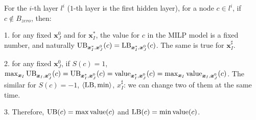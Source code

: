 				
				\begin{lemma}
					For the $i$-th layer $l^i$ ($1$-th layer is the first hidden layer), for a node $c\in l^i$, if $c\notin B_{zero}$, then:
					
					\vspace*{1ex}
					
					1. for any fixed $\boldsymbol{x}^0_J$ and for $\boldsymbol{x}^*_I$, the value for $c$ in the MILP model is a fixed number, and naturally $\mathrm{UB}_{\boldsymbol{x}^*_I,\boldsymbol{x}^0_J}(c)=\mathrm{LB}_{\boldsymbol{x}^*_I,\boldsymbol{x}^0_J}(c)$. The same is true for $\boldsymbol{x}^\sharp_I$.
					
					\vspace*{1ex}
					
					2. for any fixed $\boldsymbol{x}^0_J$, if $S(c)=1$,  $\max_{\boldsymbol{x}_I} \mathrm{UB}_{\boldsymbol{x}_I,\boldsymbol{x}^0_J}(c)=\mathrm{UB}_{\boldsymbol{x}^*_I,\boldsymbol{x}^0_J}(c)= {\textrm{value}}_{\boldsymbol{x}^*_I,\boldsymbol{x}^0_J}(c) = \max_{\boldsymbol{x}_I} {\textrm{value}}_{\boldsymbol{x}_I,\boldsymbol{x}^0_J}(c)$. The similar for $S(c)=-1$, $\langle \mathrm{LB},\min\rangle$, $x^\sharp_I$: we can change two of them at the same time.
					
					\vspace*{1ex}
					
					3. Therefore, $\mathrm{UB}(c)=\max{\textrm{value}}(c)$ and $\mathrm{LB}(c)=\min{\textrm{value}}(c)$.
					
					
				\end{lemma}
				

